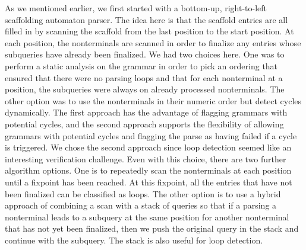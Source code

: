 \documentclass[sigplan,10pt,anonymous,review]{acmart}\settopmatter{printfolios=true,printccs=false,printacmref=false}
\begin{document}
\begin{CCSXML}
As we mentioned earlier, we first started with a bottom-up, right-to-left
scaffolding automaton parser.  The idea here is that the scaffold entries
are all filled in by scanning the scaffold from the last position to the
start position.  At each position, the nonterminals are scanned in order
to finalize any entries whose subqueries have already been finalized.
We had two choices here.  One was to perform a static analysis on the
grammar in order to pick an ordering that ensured that there were no
parsing loops and that for each nonterminal at a position, the subqueries
were always on already processed nonterminals.  The other option was to
use the nonterminals in their numeric order but detect cycles dynamically.
The first approach has the advantage of flagging grammars with
potential cycles, and the second approach supports the flexibility of allowing
grammars with potential cycles and flagging the parse as having failed if
a cycle is triggered.  We chose the second approach since loop detection
seemed like an interesting verification challenge.  Even with this choice,
there are two further algorithm options.  One is to repeatedly scan the
nonterminals at each position until a fixpoint has been reached.  At this
fixpoint, all the entries that have not been finalized can be classified as
loops.  The other option is
to use a hybrid approach of combining a scan with  a stack of queries so that if a
parsing a nonterminal leads to a subquery at the same position for another
nonterminal that has not yet been finalized, then we push the original query in the stack and continue with the subquery.  The stack is also useful for loop detection.


\end{CCSXML}
\end{document}
